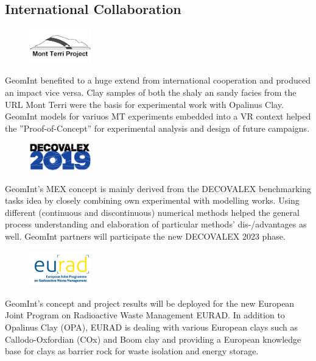 \clearpage

\subsection{International Collaboration}

\begin{figure}
\vspace{-5mm}
\centering
\includegraphics[width=0.24\textwidth]{figures/mont-terri}
\label{fig:syn-mt-terri}
\end{figure}
GeomInt benefited to a huge extend from international cooperation and produced an impact vice versa. Clay samples of both the shaly an sandy facies from the URL Mont Terri were the basis for experimental work with Opalinus Clay. GeomInt models for variuos MT experiments embedded into a VR context helped the ''Proof-of-Concept'' for experimental analysis and design of future campaigns.

\begin{figure}
\vspace{-1mm}
\centering
\includegraphics[width=0.24\textwidth]{figures/decovalex-2019}
\label{fig:syn-decovalex}
\end{figure}
GeomInt's MEX concept is mainly derived from the DECOVALEX benchmarking tasks idea by closely combining own experimental with modelling works. Using different (continuous and discontinuous) numerical methods helped the general process understanding and elaboration of particular methods' dis-/advantages as well. GeomInt partners will participate the new DECOVALEX 2023 phase. 

\begin{figure}
\vspace{-5mm}
\centering
\includegraphics[width=0.24\textwidth]{figures/eurad}
\label{fig:syn-eurad}
\end{figure}
GeomInt's concept and project results will be deployed for the new European Joint Program on Radioactive Waste Management EURAD. In addition to Opalinus Clay (OPA), EURAD is dealing with various European clays such as Callodo-Oxfordian (COx) and Boom clay and providing a European knowledge base for clays as barrier rock for waste isolation and energy storage.

